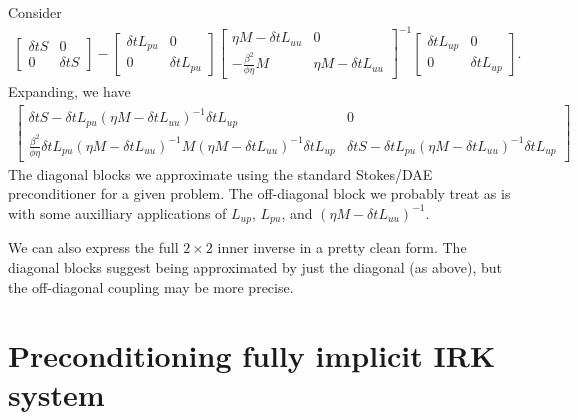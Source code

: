 \documentclass[a4paper,10pt]{article}
\begin{document}
Consider 
%
\begin{align}\label{eq:blockS_approx}
\begin{bmatrix} \delta tS & 0 \\ 0 & \delta tS\end{bmatrix} 
	- \begin{bmatrix} \delta tL_{pu} & 0 \\ 0 & \delta tL_{pu}\end{bmatrix}
	\begin{bmatrix} \eta M - \delta tL_{uu} & 0 \\
		-\frac{\beta^2}{\phi\eta}M & \eta M - \delta tL_{uu} \end{bmatrix}^{-1}
	\begin{bmatrix} \delta tL_{up} & 0 \\ 0 & \delta tL_{up} \end{bmatrix}.
\end{align}
%
Expanding, we have
%
\begin{align*}
\begin{bmatrix}
\delta tS - \delta tL_{pu}(\eta M - \delta tL_{uu})^{-1} \delta tL_{up} & 0 \\
	\frac{\beta^2}{\phi\eta}\delta tL_{pu}(\eta M - \delta tL_{uu})^{-1}M
 		(\eta M - \delta tL_{uu})^{-1}\delta tL_{up} & 
	\delta tS - \delta tL_{pu}(\eta M - \delta tL_{uu})^{-1} \delta tL_{up}\end{bmatrix}
\end{align*}
%
The diagonal blocks we approximate using the standard Stokes/DAE preconditioner
for a given problem. The off-diagonal block we probably treat as is with some
auxilliary applications of $L_{up}$, $L_{pu}$, and $(\eta M - \delta tL_{uu})^{-1}$.

We can also express the full $2\times 2$ inner inverse in a pretty clean form.
The diagonal blocks suggest being approximated by just the diagonal (as above),
but the off-diagonal coupling may be more precise.




\section{Preconditioning fully implicit IRK system}
\end{document}
